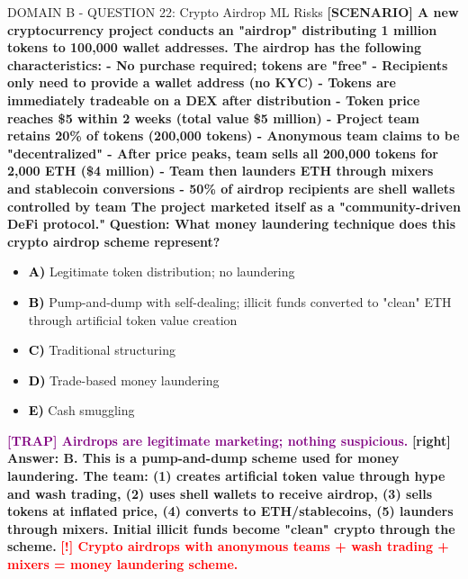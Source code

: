 \documentclass[11pt,a4paper]{beamer}
\newcommand{\redflag}[1]{\textcolor{red}{\textbf{[!] #1}}}
\newcommand{\trap}[1]{\textcolor{purple}{\textbf{[TRAP] #1}}}
\newcommand{\correct}[1]{\textcolor{green!50!black}{\textbf{[right] #1}}}
\newcommand{\scenario}[1]{\textcolor{blue!70!black}{\textbf{[SCENARIO] #1}}}
\newcommand{\option}[1]{\textcolor{black}{\textbf{#1}}}
\begin{document}
\begin{frame}{DOMAIN B - QUESTION 22: Crypto Airdrop ML Risks}
\scenario{A new cryptocurrency project conducts an "airdrop" distributing 1 million tokens to 100,000 wallet addresses. The airdrop has the following characteristics:
- No purchase required; tokens are "free"
- Recipients only need to provide a wallet address (no KYC)
- Tokens are immediately tradeable on a DEX after distribution
- Token price reaches \$5 within 2 weeks (total value \$5 million)
- Project team retains 20\% of tokens (200,000 tokens)
- Anonymous team claims to be "decentralized"
- After price peaks, team sells all 200,000 tokens for 2,000 ETH (\$4 million)
- Team then launders ETH through mixers and stablecoin conversions
- 50\% of airdrop recipients are shell wallets controlled by team
The project marketed itself as a "community-driven DeFi protocol."}
\vspace{0.2cm}
\textbf{Question: What money laundering technique does this crypto airdrop scheme represent?}
\vspace{0.1cm}
\begin{itemize}
    \item \option{A)} Legitimate token distribution; no laundering
    \item \option{B)} Pump-and-dump with self-dealing; illicit funds converted to "clean" ETH through artificial token value creation
    \item \option{C)} Traditional structuring
    \item \option{D)} Trade-based money laundering
    \item \option{E)} Cash smuggling
\end{itemize}
\vspace{0.2cm}
\trap{Airdrops are legitimate marketing; nothing suspicious.}
\correct{Answer: B. This is a pump-and-dump scheme used for money laundering. The team: (1) creates artificial token value through hype and wash trading, (2) uses shell wallets to receive airdrop, (3) sells tokens at inflated price, (4) converts to ETH/stablecoins, (5) launders through mixers. Initial illicit funds become "clean" crypto through the scheme.}
\redflag{Crypto airdrops with anonymous teams + wash trading + mixers = money laundering scheme.}
\end{frame}
\end{document}
